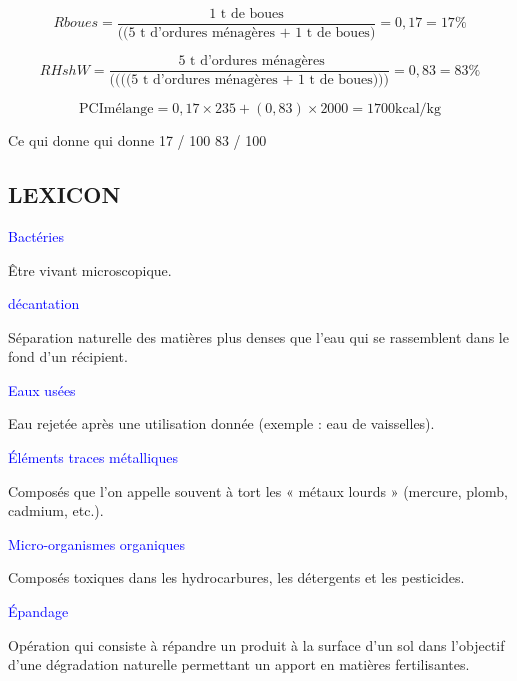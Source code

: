 \[
Rboues = \frac{\text{1 t de boues}}{\text{((5 t d'ordures ménagères + 1 t de boues)}} = 0,17 = 17\%
\]

\[
RHshW = \frac{\text{ 5 t d'ordures ménagères}}{\text{((((5 t d'ordures ménagères + 1 t de boues)))}} = 0,83 = 83\%
\]

\[
\text{PCImélange} = 0,17 \times 235 + (0,83) \times 2000 = 1700 \text{kcal/kg}
\]

Ce qui donne	qui donne
17 / 100	83 / 100
\newpage
\subsection{LEXICON}

\vspace{0.3cm}
\textcolor{blue}{Bactéries}
\vspace{0.3cm}

Être vivant microscopique.

\vspace{0.3cm}
\textcolor{blue}{décantation}
\vspace{0.3cm}

Séparation naturelle des matières plus denses que l’eau qui se rassemblent dans le fond d’un récipient.

\vspace{0.3cm} 
\textcolor{blue}{Eaux usées} 
\vspace{0.3cm}

Eau rejetée après une utilisation donnée (exemple : eau de vaisselles).

\vspace{0,3cm} 
\textcolor{blue}{Éléments traces métalliques}
\vspace{0,3cm}

Composés que l’on appelle souvent à tort les « métaux lourds » (mercure, plomb, cadmium, etc.).


\vspace{0.3cm}
\textcolor{blue}{Micro-organismes organiques}
\vspace{0.3cm}


Composés toxiques dans les hydrocarbures, les détergents et les pesticides.

\vspace{0.3cm}
\textcolor{blue}{Épandage }
\vspace{0.3cm}

Opération qui consiste à répandre un produit à la surface d’un sol dans l’objectif d’une dégradation naturelle permettant un apport en matières fertilisantes.


